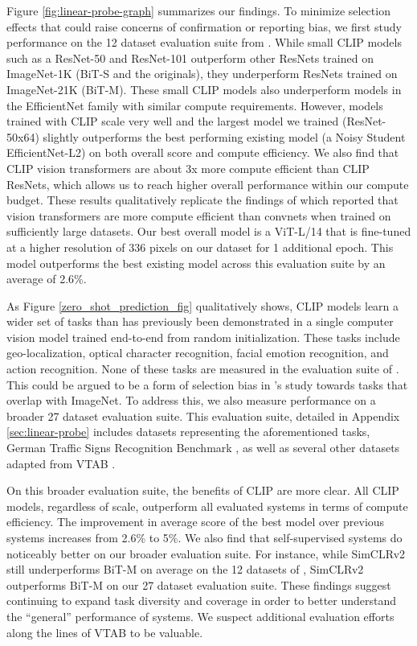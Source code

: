 Figure \ref{fig:linear-probe-graph} summarizes our findings. To minimize selection effects that could raise concerns of confirmation or reporting bias, we first study performance on the 12 dataset evaluation suite from \citet{kornblith2019better}. While small CLIP models such as a ResNet-50 and ResNet-101 outperform other ResNets trained on ImageNet-1K (BiT-S and the originals), they underperform ResNets trained on ImageNet-21K (BiT-M). These small CLIP models also underperform models in the EfficientNet family with similar compute requirements. However, models trained with CLIP scale very well and the largest model we trained (ResNet-50x64) slightly outperforms the best performing existing model (a Noisy Student EfficientNet-L2) on both overall score and compute efficiency. We also find that CLIP vision transformers are about 3x more compute efficient than CLIP ResNets, which allows us to reach higher overall performance within our compute budget. These results qualitatively replicate the findings of \citet{dosovitskiy2020image} which reported that vision transformers are more compute efficient than convnets when trained on sufficiently large datasets. Our best overall model is a ViT-L/14 that is fine-tuned at a higher resolution of 336 pixels on our dataset for 1 additional epoch. This model outperforms the best existing model across this evaluation suite by an average of 2.6\%.

As Figure \ref{zero_shot_prediction_fig} qualitatively shows, CLIP models learn a wider set of tasks than has previously been demonstrated in a single computer vision model trained end-to-end from random initialization. These tasks include geo-localization, optical character recognition, facial emotion recognition, and action recognition. None of these tasks are measured in the evaluation suite of \citet{kornblith2019better}. This could be argued to be a form of selection bias in \citet{kornblith2019better}'s study towards tasks that overlap with ImageNet. To address this, we also measure performance on a broader 27 dataset evaluation suite. This evaluation suite, detailed in Appendix \ref{sec:linear-probe} includes datasets representing the aforementioned tasks, German Traffic Signs Recognition Benchmark \citep{GTSRB2011}, as well as several other datasets adapted from VTAB \citep{zhai2019large}.

On this broader evaluation suite, the benefits of CLIP are more clear. All CLIP models, regardless of scale, outperform all evaluated systems in terms of compute efficiency. The improvement in average score of the best model over previous systems increases from 2.6\% to 5\%. We also find that self-supervised systems do noticeably better on our broader evaluation suite. For instance, while SimCLRv2 still underperforms BiT-M on average on the 12 datasets of \citet{kornblith2019better}, SimCLRv2 outperforms BiT-M on our 27 dataset evaluation suite. These findings suggest continuing to expand task diversity and coverage in order to better understand the ``general'' performance of systems. We suspect additional evaluation efforts along the lines of VTAB to be valuable.

